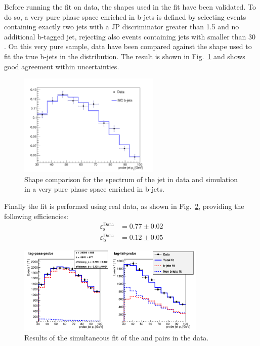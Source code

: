 Before running the fit on data, the shapes used in the fit have been validated. To do so, a very pure phase space enriched in b-jets is defined by selecting events containing exactly two jets with a JP discriminator greater than 1.5 and no additional b-tagged jet, rejecting also events containing jets with \pt smaller than 30 \GeV. On this very pure sample, data have been compared against the shape used to fit the true b-jets in the \tpp distribution. The result is shown in Fig.~\ref{fig:purett} and shows good agreement within uncertainties.

\begin{figure}[htb]
\centering
\includegraphics[width=0.6\textwidth]{images/passprobe_data_mc-v2.pdf}
\caption{Shape comparison for the \pt spectrum of the \probe jet in data and simulation in a very pure phase space enriched in b-jets.\label{fig:purett}}
\end{figure}

Finally the fit is performed using real data, as shown in Fig.~\ref{fig:data_tp}, providing the following efficiencies:
\begin{equation}
\begin{split}
\varepsilon_\mathrm{s}^\mathrm{Data} &= 0.77\pm0.02\\
\varepsilon_\mathrm{b}^\mathrm{Data} &= 0.12\pm0.05
\end{split}
\end{equation}

\begin{figure}[htb]
\centering
\includegraphics[width=0.8\textwidth]{images/data_ptprobe-v3.pdf}
\caption{Results of the simultaneous fit of the \tpp and \tfp pairs in the data.\label{fig:data_tp}}
\end{figure}

